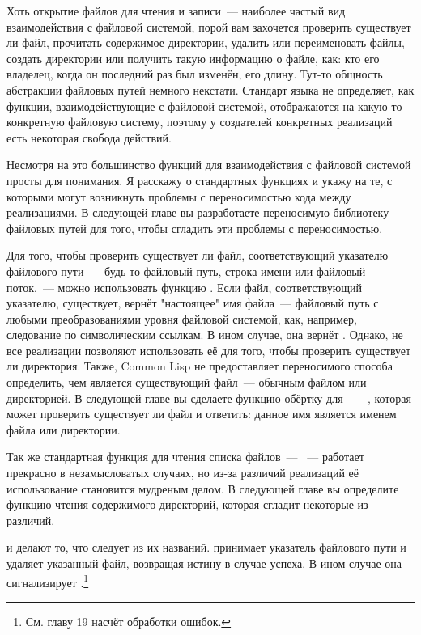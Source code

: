Хоть открытие файлов для чтения и записи~--- наиболее частый вид взаимодействия с файловой
системой, порой вам захочется проверить существует ли файл, прочитать содержимое
директории, удалить или переименовать файлы, создать директории или получить такую
информацию о файле, как: кто его владелец, когда он последний раз был изменён, его
длину. Тут-то общность абстракции файловых путей немного некстати. Стандарт языка не
определяет, как функции, взаимодействующие с файловой системой, отображаются на какую-то
конкретную файловую систему, поэтому у создателей конкретных реализаций есть некоторая
свобода действий.

Несмотря на это большинство функций для взаимодействия с файловой системой просты для
понимания. Я расскажу о стандартных функциях и укажу на те, с которыми могут возникнуть
проблемы с переносимостью кода между реализациями. В следующей главе вы разработаете
переносимую библиотеку файловых путей для того, чтобы сгладить эти проблемы с
переносимостью.

Для того, чтобы проверить существует ли файл, соответствующий указателю файлового пути~---
будь-то файловый путь, строка имени или файловый поток,~--- можно использовать функцию
. Если файл, соответствующий указателю, существует, 
вернёт "настоящее" имя файла~--- файловый путь с любыми преобразованиями уровня файловой
системой, как, например, следование по символическим ссылкам. В ином случае, она вернёт
. Однако, не все реализации позволяют использовать её для того, чтобы проверить
существует ли директория. Также, Common Lisp не предоставляет переносимого способа
определить, чем является существующий файл~--- обычным файлом или директорией. В следующей
главе вы сделаете функцию-обёртку для ~--- , которая
может проверить существует ли файл и ответить: данное имя является именем файла или
директории.

Так же стандартная функция для чтения списка файлов~--- ~--- работает
прекрасно в незамысловатых случаях, но из-за различий реализаций её использование
становится мудреным делом. В следующей главе вы определите функцию чтения содержимого
директорий, которая сгладит некоторые из различий.

 и  делают то, что следует из их
названий.  принимает указатель файлового пути и удаляет указанный файл,
возвращая истину в случае успеха. В ином случае она сигнализирует
.\footnote{См. главу 19 насчёт обработки ошибок.}

